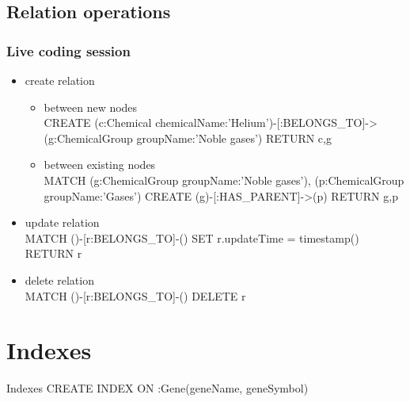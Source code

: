 \documentclass[12pt]{beamer}
\begin{document}
    \subsection{Relation operations}
    \begin{frame}
        \frametitle{Live coding session}
        \begin{itemize}
            \item create relation\\
            \begin{itemize}
                \item between new nodes\\
                CREATE (c:Chemical {chemicalName:'Helium'})-[:BELONGS\_TO]->(g:ChemicalGroup {groupName:'Noble gases'}) RETURN c,g
                \item between existing nodes\\
                MATCH (g:ChemicalGroup {groupName:'Noble gases'}), (p:ChemicalGroup {groupName:'Gases'})
                CREATE (g)-[:HAS\_PARENT]->(p) RETURN g,p
            \end{itemize}
            \item update relation\\
            MATCH ()-[r:BELONGS\_TO]-() SET r.updateTime = timestamp() RETURN r\\
            \item delete relation\\
            MATCH ()-[r:BELONGS\_TO]-() DELETE r
        \end{itemize}
    \end{frame}
    
    \section{Indexes}
    \begin{frame}{Indexes}
        CREATE INDEX ON :Gene(geneName, geneSymbol)
    \end{frame}
    
\end{document}
